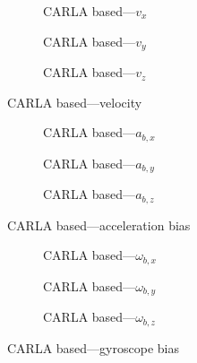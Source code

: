 \begin{figure}[H]
    \centering
    \begin{subfigure}{0.3\textwidth}
        
        \caption{CARLA based---$v_x$}
    \end{subfigure}
    \hfill
    \begin{subfigure}{0.3\textwidth}
        
        \caption{CARLA based---$v_y$}
    \end{subfigure}
    \hfill
    \begin{subfigure}{0.3\textwidth}
        
        \caption{CARLA based---$v_z$}
    \end{subfigure}
    \caption{CARLA based---velocity}\label{fig:carla-vel}
\end{figure}

\begin{figure}[H]
    \centering
    \begin{subfigure}{0.3\textwidth}
        
        \caption{CARLA based---$a_{b,x}$}
    \end{subfigure}
    \hfill
    \begin{subfigure}{0.3\textwidth}
        
        \caption{CARLA based---$a_{b,y}$}
    \end{subfigure}
    \hfill
    \begin{subfigure}{0.3\textwidth}
        
        \caption{CARLA based---$a_{b,z}$}
    \end{subfigure}
    \caption{CARLA based---acceleration bias}\label{fig:carla-abias}
\end{figure}

\begin{figure}[H]
    \centering
    \begin{subfigure}{0.3\textwidth}
        
        \caption{CARLA based---$\omega_{b,x}$}
    \end{subfigure}
    \hfill
    \begin{subfigure}{0.3\textwidth}
        
        \caption{CARLA based---$\omega_{b,y}$}
    \end{subfigure}
    \hfill
    \begin{subfigure}{0.3\textwidth}
        
        \caption{CARLA based---$\omega_{b,z}$}
    \end{subfigure}
    \caption{CARLA based---gyroscope bias}\label{fig:carla-gbias}
\end{figure}

